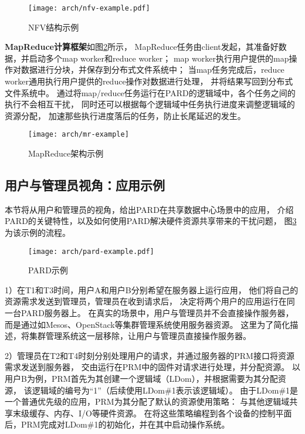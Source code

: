 \begin{figure}[htb]
  \centering
  \texttt{[image: arch/nfv-example.pdf]}
  \caption{NFV结构示例\cite{etsi_nfv_2014}}
  \label{fig:nfv-example}
\end{figure}


\textbf{MapReduce计算框架}如图\ref{fig:mr-example}所示，
MapReduce任务由client发起，其准备好数据，并启动多个map worker和reduce worker；
map worker执行用户提供的map操作对数据进行分块，并保存到分布式文件系统中；
当map任务完成后，reduce worker通用执行用户提供的reduce操作对数据进行处理，
并将结果写回到分布式文件系统中。
通过将map/reduce任务运行在PARD的逻辑域中，各个任务之间的执行不会相互干扰，
同时还可以根据每个逻辑域中任务执行进度来调整逻辑域的资源分配，
加速那些执行进度落后的任务，防止长尾延迟的发生。

\begin{figure}[htb]
  \centering
  \texttt{[image: arch/mr-example]}
  \caption{MapReduce架构示例}
  \label{fig:mr-example}
\end{figure}


\subsection{用户与管理员视角：应用示例}

本节将从用户和管理员的视角，给出PARD在共享数据中心场景中的应用，
介绍PARD的关键特性，以及如何使用PARD解决硬件资源共享带来的干扰问题，
图\ref{fig:pard-example}为该示例的流程。

\begin{figure}[b]
  \centering
  \texttt{[image: arch/pard-example.pdf]}
  \caption{PARD示例}
  \label{fig:pard-example}
\end{figure}

1）在T1和T3时间，用户A和用户B分别希望在服务器上运行应用，
他们将自己的资源需求发送到管理员，管理员在收到请求后，
决定将两个用户的应用运行在同一台PARD服务器上。
在真实的场景中，用户与管理员并不会直接操作服务器，
而是通过如Mesos\cite{Hindman:2011:Mesos}、OpenStack\cite{OpenStack}等集群管理系统使用服务器资源。
这里为了简化描述，将集群管理系统这一层移除，让用户与管理员直接操作服务器。

2）管理员在T2和T4时刻分别处理用户的请求，并通过服务器的PRM接口将资源需求发送到服务器，
交由运行在PRM中的固件对请求进行处理，并分配资源。
以用户B为例，PRM首先为其创建一个逻辑域（LDom），并根据需要为其分配资源，
该逻辑域的编号为``1''（后续使用LDom\#1表示该逻辑域）。
由于LDom\#1是一个普通优先级的应用，PRM为其分配了默认的资源使用策略：
与其他逻辑域共享末级缓存、内存、I/O等硬件资源。
在将这些策略编程到各个设备的控制平面后，PRM完成对LDom\#1的初始化，并在其中启动操作系统。

